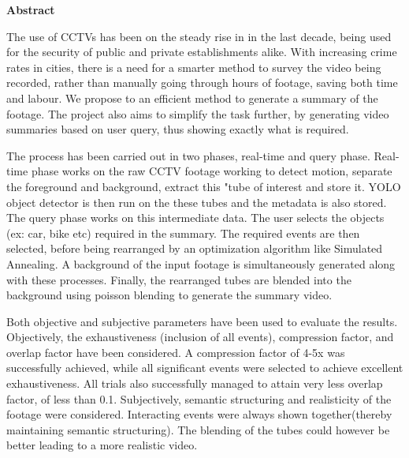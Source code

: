\begin{center}
	\huge\bfseries Abstract

	\normalsize
	The use of CCTVs has been on the steady rise in in the last decade, being used for the security of public and private establishments alike. With increasing crime rates in cities, there is a need for a smarter method to survey the video being recorded, rather than manually going through hours of footage, saving both time and labour. We propose to an efficient method to generate a summary of the footage. The project also aims to simplify the task further, by generating video summaries based on user query, thus showing exactly what is required.

	The process has been carried out in two phases, real-time and query phase. Real-time phase works on the raw CCTV footage working to detect motion, separate the foreground and background, extract this "tube of interest and store it. YOLO object detector is then run on the these tubes and the metadata is also stored. The query phase works on this intermediate data. The user selects the objects (ex: car, bike etc)  required in the summary. The required events are then selected, before being rearranged by an optimization algorithm like Simulated Annealing. A background of the input footage is simultaneously generated along with these processes. Finally, the rearranged tubes are blended into the background using poisson blending to generate the summary video.

	Both objective and subjective parameters have been used to evaluate the results. Objectively, the exhaustiveness (inclusion of all events), compression factor, and overlap factor have been considered. A compression factor of 4-5x was successfully achieved, while all significant events were selected to achieve excellent exhaustiveness. All trials also successfully managed to attain very less overlap factor, of less than 0.1. Subjectively, semantic structuring and realisticity of the footage were considered. Interacting events were always shown together(thereby maintaining semantic structuring). The blending of the tubes could however be better leading to a more realistic video.

\end{center}

\bigskip



\pagebreak

\cleardoublepage

\tableofcontents
\listoffigures
\listoftables
\printglossary[type=\acronymtype,style=long,title=Glossary,nonumberlist]

\cleardoublepage